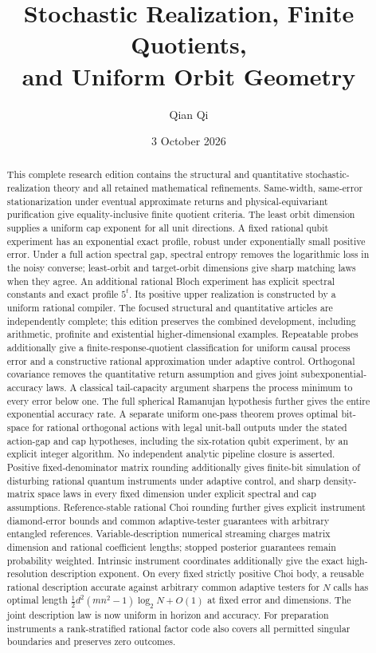 \documentclass[11pt]{amsart}
\title[Stochastic realization and orbit geometry]{Stochastic Realization, Finite Quotients,\\and Uniform Orbit Geometry}
\author{Qian Qi}
\date{3 October 2026}
\numberwithin{equation}{section}
\theoremstyle{definition}\newtheorem{definition}[theorem]{Definition}
\theoremstyle{remark}\newtheorem{remark}[theorem]{Remark}
\begin{document}
\raggedbottom
\begin{abstract}
This complete research edition contains the structural and quantitative
stochastic-realization theory and all retained mathematical refinements.
Same-width, same-error stationarization under eventual approximate returns
and physical-equivariant purification give equality-inclusive finite
quotient criteria. The least orbit dimension supplies a uniform cap
exponent for all unit directions. A fixed rational qubit experiment has
an exponential exact profile, robust under exponentially small positive
error. Under a full action spectral gap, spectral entropy removes the logarithmic loss in the noisy
converse; least-orbit and target-orbit dimensions give sharp matching
laws when they agree. An additional rational Bloch experiment has
explicit spectral constants and exact profile $5^t$. Its positive upper realization is constructed by a uniform
rational compiler. The focused structural and quantitative articles are
independently complete; this edition preserves the combined development,
including arithmetic, profinite and existential higher-dimensional
examples. Repeatable probes additionally give a finite-response-quotient
classification for uniform causal process error and a constructive
rational approximation under adaptive control. Orthogonal covariance removes the quantitative return assumption and
gives joint subexponential-accuracy laws. A classical tail-capacity
argument sharpens the process minimum to every error below one.
The full spherical Ramanujan hypothesis further gives the entire
exponential accuracy rate. A separate uniform one-pass theorem proves
optimal bit-space for rational orthogonal actions with legal unit-ball
outputs under the stated action-gap and cap hypotheses, including the
six-rotation qubit experiment, by an explicit
integer algorithm. No independent analytic pipeline closure is asserted.
Positive fixed-denominator matrix rounding additionally gives
finite-bit simulation of disturbing rational quantum instruments
under adaptive control, and sharp density-matrix space laws in every
fixed dimension under explicit spectral and cap assumptions.
Reference-stable rational Choi rounding further gives explicit
instrument diamond-error bounds and common adaptive-tester guarantees
with arbitrary entangled references. Variable-description numerical
streaming charges matrix dimension and rational coefficient lengths;
stopped posterior guarantees remain probability weighted.
Intrinsic instrument coordinates additionally give the exact
high-resolution description exponent. On every fixed strictly positive
Choi body, a reusable rational description accurate against arbitrary
common adaptive testers for $N$ calls has optimal length
$\tfrac12d^2(mn^2-1)\log_2N+O(1)$ at fixed error and dimensions.
The joint description law is now uniform in horizon and accuracy.
For preparation instruments a rank-stratified rational factor code also
covers all permitted singular boundaries and preserves zero outcomes.
\end{abstract}
\end{document}
